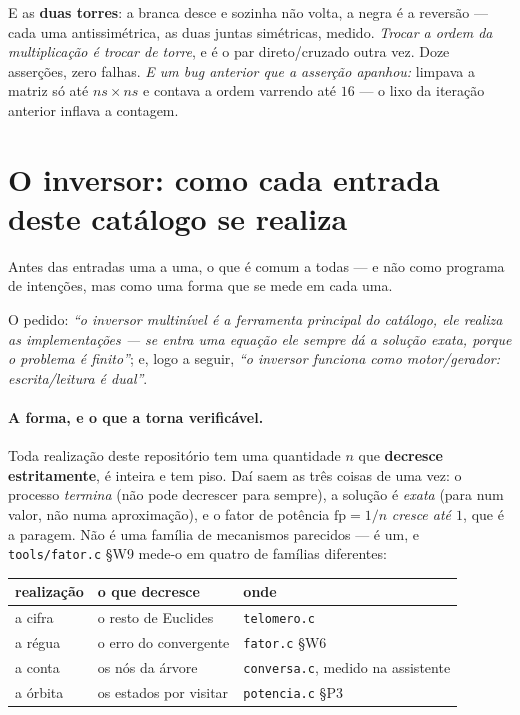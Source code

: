 \documentclass[11pt]{article}
\newcommand{\code}[1]{\texttt{\small #1}}
\theoremstyle{plain}
\theoremstyle{remark}
\begin{document}
\begin{itemize}
E as \textbf{duas torres}: a branca desce e sozinha não volta, a negra é a reversão --- cada uma
antissimétrica, as duas juntas simétricas, medido. \emph{Trocar a ordem da multiplicação é trocar de
torre}, e é o par direto/cruzado outra vez. Doze asserções, zero falhas.
\emph{E um bug anterior que a asserção apanhou:} limpava a matriz só até $ns\times ns$ e contava a ordem
varrendo até $16$ --- o lixo da iteração anterior inflava a contagem. 

\section{O inversor: como cada entrada deste catálogo se realiza}

Antes das entradas uma a uma, o que é comum a todas --- e não como programa de intenções, mas como
uma forma que se mede em cada uma.

O pedido: \emph{``o inversor multinível é a ferramenta principal do catálogo, ele realiza as
implementações --- se entra uma equação ele sempre dá a solução exata, porque o problema é
finito''}; e, logo a seguir, \emph{``o inversor funciona como motor/gerador: escrita/leitura é
dual''}.

\paragraph{A forma, e o que a torna verificável.} Toda realização deste repositório tem uma
quantidade $n$ que \textbf{decresce estritamente}, é inteira e tem piso. Daí saem as três coisas de
uma vez: o processo \emph{termina} (não pode decrescer para sempre), a solução é \emph{exata} (para
num valor, não numa aproximação), e o fator de potência $\mathrm{fp} = 1/n$ \emph{cresce até $1$},
que é a paragem. Não é uma família de mecanismos parecidos --- é um, e \code{tools/fator.c} §W9
mede-o em quatro de famílias diferentes:

\begin{center}\small
\begin{tabular}{lll}
\hline
realização & o que decresce & onde \\ \hline
a cifra & o resto de Euclides & \code{telomero.c} \\
a régua & o erro do convergente & \code{fator.c} §W6 \\
a conta & os nós da árvore & \code{conversa.c}, medido na assistente \\
a órbita & os estados por visitar & \code{potencia.c} §P3 \\
\hline
\end{tabular}
\end{center}


\end{itemize}
\end{document}
